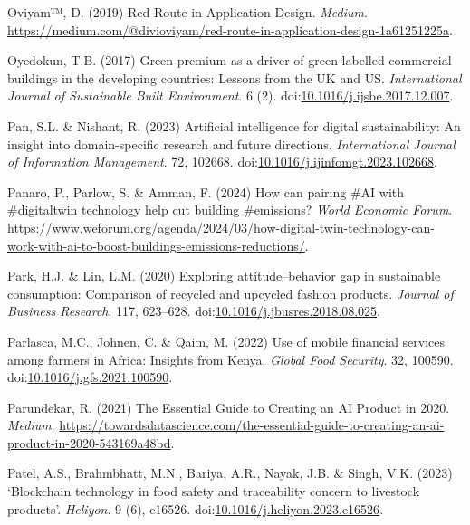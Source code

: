 \documentclass[
  letterpaper,
  DIV=11,
  numbers=noendperiod]{scrartcl}
\newlength{\cslhangindent}
\newenvironment{CSLReferences}[2] %
 {\begin{list}{}{%
  \setlength{\itemindent}{0pt}
  \setlength{\leftmargin}{0pt}
  \setlength{\parsep}{0pt}
  \ifodd #1
   \setlength{\leftmargin}{\cslhangindent}
   \setlength{\itemindent}{-1\cslhangindent}
  \fi
  \setlength{\itemsep}{#2\baselineskip}}}
 {\end{list}}
\begin{document}
\begin{CSLReferences}{0}{1}
Oviyam™, D. (2019) Red {Route} in {Application Design}. \emph{Medium}.
\url{https://medium.com/@divioviyam/red-route-in-application-design-1a61251225a}.

Oyedokun, T.B. (2017) Green premium as a driver of green-labelled
commercial buildings in the developing countries: {Lessons} from the
{UK} and {US}. \emph{International Journal of Sustainable Built
Environment}. 6 (2).
doi:\href{https://doi.org/10.1016/j.ijsbe.2017.12.007}{10.1016/j.ijsbe.2017.12.007}.

Pan, S.L. \& Nishant, R. (2023) Artificial intelligence for digital
sustainability: {An} insight into domain-specific research and future
directions. \emph{International Journal of Information Management}. 72,
102668.
doi:\href{https://doi.org/10.1016/j.ijinfomgt.2023.102668}{10.1016/j.ijinfomgt.2023.102668}.

Panaro, P., Parlow, S. \& Amman, F. (2024) How can pairing \#{AI} with
\#digitaltwin technology help cut building \#emissions? \emph{World
Economic Forum}.
\url{https://www.weforum.org/agenda/2024/03/how-digital-twin-technology-can-work-with-ai-to-boost-buildings-emissions-reductions/}.

Park, H.J. \& Lin, L.M. (2020) Exploring attitude--behavior gap in
sustainable consumption: Comparison of recycled and upcycled fashion
products. \emph{Journal of Business Research}. 117, 623--628.
doi:\href{https://doi.org/10.1016/j.jbusres.2018.08.025}{10.1016/j.jbusres.2018.08.025}.

Parlasca, M.C., Johnen, C. \& Qaim, M. (2022) Use of mobile financial
services among farmers in {Africa}: {Insights} from {Kenya}.
\emph{Global Food Security}. 32, 100590.
doi:\href{https://doi.org/10.1016/j.gfs.2021.100590}{10.1016/j.gfs.2021.100590}.

Parundekar, R. (2021) The {Essential Guide} to {Creating} an {AI
Product} in 2020. \emph{Medium}.
\url{https://towardsdatascience.com/the-essential-guide-to-creating-an-ai-product-in-2020-543169a48bd}.

Patel, A.S., Brahmbhatt, M.N., Bariya, A.R., Nayak, J.B. \& Singh, V.K.
(2023) {`{Blockchain} technology in food safety and traceability concern
to livestock products'}. \emph{Heliyon}. 9 (6), e16526.
doi:\href{https://doi.org/10.1016/j.heliyon.2023.e16526}{10.1016/j.heliyon.2023.e16526}.


\end{CSLReferences}
\end{document}
